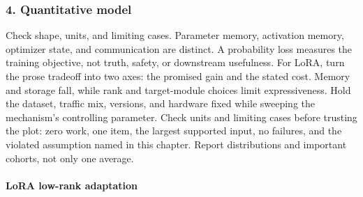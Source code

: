 \subsubsection*{4. Quantitative model}
Check shape, units, and limiting cases. Parameter memory, activation memory, optimizer state, and communication are distinct. A probability loss measures the training objective, not truth, safety, or downstream usefulness.
For LoRA, turn the prose tradeoff into two axes: the promised gain and the stated cost. Memory and storage fall, while rank and target-module choices limit expressiveness. Hold the dataset, traffic mix, versions, and hardware fixed while sweeping the mechanism's controlling parameter.
Check units and limiting cases before trusting the plot: zero work, one item, the largest supported input, no failures, and the violated assumption named in this chapter. Report distributions and important cohorts, not only one average.
\paragraph{LoRA low-rank adaptation}
